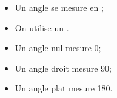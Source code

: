 \begin{mydef}
	\begin{itemize}
		\item Un angle se mesure en ;
		\item On utilise un .
		
	\end{itemize}
\end{mydef}

\begin{myexs}
	\begin{itemize}
		\item Un angle nul mesure 0\degree;
		\item Un angle droit mesure 90\degree;
		\item Un angle plat mesure 180\degree.
	\end{itemize}
\end{myexs}